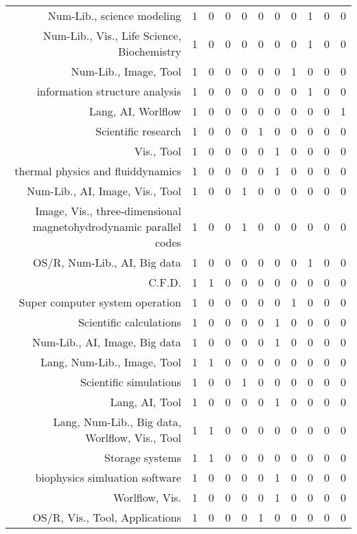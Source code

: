 {\begin{landscape}
\begin{longtable}[htb]{r|c|c|c|c|c|c|c|c|c|c}
{Num-Lib., science modeling} & 1 & 0 & 0 & 0 & 0 & 0 & 0 & 1 & 0 & 0 \\%
{Num-Lib., Vis., Life Science, Biochemistry} & 1 & 0 & 0 & 0 & 0 & 0 & 0 & 1 & 0 & 0 \\%
{Num-Lib., Image, Tool} & 1 & 0 & 0 & 0 & 0 & 0 & 1 & 0 & 0 & 0 \\%
{information structure analysis} & 1 & 0 & 0 & 0 & 0 & 0 & 0 & 1 & 0 & 0 \\%
{Lang, AI, Worlflow} & 1 & 0 & 0 & 0 & 0 & 0 & 0 & 0 & 0 & 1 \\%
{Scientific research} & 1 & 0 & 0 & 0 & 1 & 0 & 0 & 0 & 0 & 0 \\%
{Vis., Tool} & 1 & 0 & 0 & 0 & 0 & 1 & 0 & 0 & 0 & 0 \\%
{thermal physics and fluiddynamics} & 1 & 0 & 0 & 0 & 0 & 1 & 0 & 0 & 0 & 0 \\%
{Num-Lib., AI, Image, Vis., Tool} & 1 & 0 & 0 & 1 & 0 & 0 & 0 & 0 & 0 & 0 \\%
{Image, Vis., three-dimensional magnetohydrodynamic parallel codes} & 1 & 0 & 0 & 1 & 0 & 0 & 0 & 0 & 0 & 0 \\%
{OS/R, Num-Lib., AI, Big data} & 1 & 0 & 0 & 0 & 0 & 0 & 0 & 1 & 0 & 0 \\%
{C.F.D.} & 1 & 1 & 0 & 0 & 0 & 0 & 0 & 0 & 0 & 0 \\%
{Super computer system operation} & 1 & 0 & 0 & 0 & 0 & 0 & 1 & 0 & 0 & 0 \\%
{Scientific calculations} & 1 & 0 & 0 & 0 & 0 & 1 & 0 & 0 & 0 & 0 \\%
{Num-Lib., AI, Image, Big data} & 1 & 0 & 0 & 0 & 0 & 1 & 0 & 0 & 0 & 0 \\%
{Lang, Num-Lib., Image, Tool} & 1 & 1 & 0 & 0 & 0 & 0 & 0 & 0 & 0 & 0 \\%
{Scientific simulations} & 1 & 0 & 0 & 1 & 0 & 0 & 0 & 0 & 0 & 0 \\%
{Lang, AI, Tool} & 1 & 0 & 0 & 0 & 0 & 1 & 0 & 0 & 0 & 0 \\%
{Lang, Num-Lib., Big data, Worlflow, Vis., Tool} & 1 & 1 & 0 & 0 & 0 & 0 & 0 & 0 & 0 & 0 \\%
{Storage systems} & 1 & 1 & 0 & 0 & 0 & 0 & 0 & 0 & 0 & 0 \\%
{biophysics simluation software} & 1 & 0 & 0 & 0 & 0 & 1 & 0 & 0 & 0 & 0 \\%
{Worlflow, Vis.} & 1 & 0 & 0 & 0 & 0 & 1 & 0 & 0 & 0 & 0 \\%
{OS/R, Vis., Tool, Applications} & 1 & 0 & 0 & 0 & 1 & 0 & 0 & 0 & 0 & 0 \\%

\end{longtable}
\end{landscape}}
